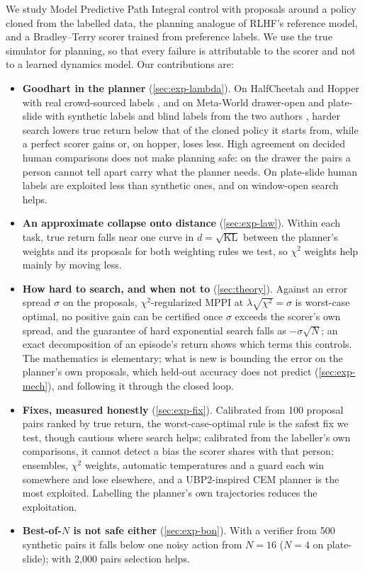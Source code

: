 \documentclass{article}
\theoremstyle{plain}
\theoremstyle{remark}
\newcommand{\KL}{\mathrm{KL}}
\begin{document}
We study Model Predictive Path Integral control \citep[MPPI;][]{williams2017mppi,williams2017information} with proposals
around a policy cloned from the labelled data, the planning analogue of RLHF's reference model, and a Bradley--Terry
scorer trained from preference labels. We use the true simulator for planning, so that every failure is attributable to
the scorer and not to a learned dynamics model. Our contributions are:
\begin{itemize}
\item \textbf{Goodhart in the planner} (\cref{sec:exp-lambda}). On HalfCheetah and Hopper with real crowd-sourced labels
  \citep{yuan2024unirlhf}, and on Meta-World drawer-open and plate-slide with synthetic labels and blind labels from
  the two authors \citep{yu2020metaworld}, harder search lowers true return below that of the cloned policy it starts from, while
  a perfect scorer gains or, on hopper, loses less. High agreement on decided human comparisons does not make planning
  safe: on the drawer the pairs a person cannot tell apart carry what the planner needs. On plate-slide human labels
  are exploited less than synthetic ones, and on window-open search helps.
\item \textbf{An approximate collapse onto distance} (\cref{sec:exp-law}). Within each task, true return falls near one
  curve in $d=\sqrt{\KL}$ between the planner's weights and its proposals for both weighting rules we test, so $\chi^2$
  weights help mainly by moving less.
\item \textbf{How hard to search, and when not to} (\cref{sec:theory}). Against an error spread $\sigma$ on the
  proposals, $\chi^2$-regularized MPPI at $\lambda\sqrt{\chi^2}=\sigma$ is worst-case optimal, no positive gain can be
  certified once $\sigma$ exceeds the scorer's own spread, and the guarantee of hard exponential search falls as
  $-\sigma\sqrt N$; an exact decomposition of an episode's return shows which terms this controls. The mathematics is elementary;
  what is new is bounding the error on the planner's own proposals, which held-out accuracy does not predict
  (\cref{sec:exp-mech}), and following it through the closed loop.
\item \textbf{Fixes, measured honestly} (\cref{sec:exp-fix}). Calibrated from 100 proposal pairs ranked by true return,
  the worst-case-optimal rule is the safest fix we test, though cautious where search helps; calibrated from the
  labeller's own comparisons, it cannot detect a bias the scorer shares with that person; ensembles, $\chi^2$ weights, automatic temperatures
  and a guard each win somewhere and lose elsewhere, and a UBP2-inspired CEM planner \citep{nabail2026ubp2} is the most
  exploited. Labelling the planner's own trajectories reduces the exploitation.
\item \textbf{Best-of-$N$ is not safe either} (\cref{sec:exp-bon}). With a verifier from 500 synthetic pairs it falls below
  one noisy action from $N=16$ ($N=4$ on plate-slide); with 2,000 pairs selection helps.
\end{itemize}
\end{document}
